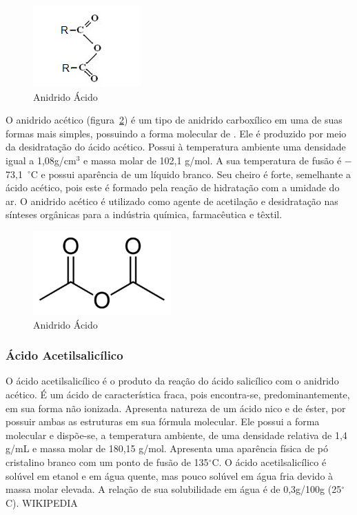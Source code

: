 \begin{figure}[H]
\begin{center}
    \includegraphics[scale=1.2]{figuras/anidrido_acido.png}
\end{center}
\caption{Anidrido Ácido}
\label{fig:ani_acido}
\end{figure}

O anidrido acético (figura~\ref{fig:ani_acetico}) é um tipo de anidrido carboxílico em uma de suas formas mais
simples, possuindo a forma molecular de . Ele é produzido por meio da desidratação do ácido
acético.  Possui à temperatura ambiente uma densidade igual a 1,08g/cm$^3$ e massa molar de 102,1
g/mol. A sua temperatura de fusão é $-$73,1 $^\circ$C e possui aparência de um líquido branco. Seu cheiro é
forte, semelhante a ácido acético, pois este é formado pela reação de hidratação com a umidade do
ar. O anidrido acético é utilizado como agente de acetilação e desidratação nas sínteses orgânicas para
a indústria química, farmacêutica e têxtil.

\begin{figure}[H]
\begin{center}
    \includegraphics[scale=0.8]{figuras/anidrido_acetico.png}
\end{center}
\caption{Anidrido Ácido}
\label{fig:ani_acetico}
\end{figure}

\subsubsection{Ácido Acetilsalicílico}

O ácido acetilsalicílico é o produto da reação do ácido salicílico com o anidrido acético. É um
ácido de característica fraca, pois encontra-se, predominantemente, em sua forma não ionizada.
Apresenta natureza de um ácido nico e de éster, por possuir ambas as estruturas em sua fórmula
molecular. Ele possui a forma molecular  e dispõe-se, a temperatura ambiente, de uma densidade
relativa de 1,4 g/mL e massa molar de 180,15 g/mol. Apresenta uma aparência física de pó cristalino
branco com um ponto de fusão de 135$^\circ$C. O ácido acetilsalicílico é solúvel em etanol e em água
quente, mas pouco solúvel em água fria devido à massa molar elevada.  A relação de sua solubilidade
em água é de 0,3g/100g (25$^\circ$C). WIKIPEDIA

